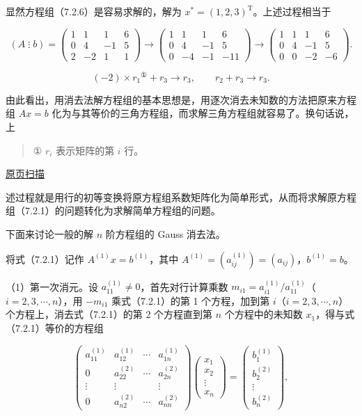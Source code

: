 \documentclass[
  10pt,
  fontset=fandol]{ctexart}
\begin{document}
显然方程组（7.2.6）是容易求解的，解为 \(x^*=(1,2,3)^{\mathrm T}\)。上述过程相当于

\[
(A\mathbin{\vdots}b)=
\left(\begin{array}{rrr|r}1&1&1&6\\0&4&-1&5\\2&-2&1&1\end{array}\right)
\longrightarrow
\left(\begin{array}{rrr|r}1&1&1&6\\0&4&-1&5\\0&-4&-1&-11\end{array}\right)
\longrightarrow
\left(\begin{array}{rrr|r}1&1&1&6\\0&4&-1&5\\0&0&-2&-6\end{array}\right).
\]

\[(-2)\times r_1{}^{\text{①}}+r_3\to r_3,\qquad r_2+r_3\to r_3.\]

由此看出，用消去法解方程组的基本思想是，用逐次消去未知数的方法把原来方程组 \(Ax=b\) 化为与其等价的三角方程组，而求解三角方程组就容易了。换句话说，上

\begin{quote}
① \(r_i\) 表示矩阵的第 \(i\) 行。
\end{quote}

\href{../../source-images/pdf-179.jpeg}{原页扫描}

述过程就是用行的初等变换将原方程组系数矩阵化为简单形式，从而将求解原方程组（7.2.1）的问题转化为求解简单方程组的问题。

下面来讨论一般的解 \(n\) 阶方程组的 Gauss 消去法。

将式（7.2.1）记作 \(A^{(1)}x=b^{(1)}\)，其中 \(A^{(1)}=(a_{ij}^{(1)})=(a_{ij})\)，\(b^{(1)}=b\)。

（1）第一次消元。设 \(a_{11}^{(1)}\ne0\)，首先对行计算乘数 \(m_{i1}=a_{i1}^{(1)}/a_{11}^{(1)}\)（\(i=2,3,\cdots,n\)），用 \(-m_{i1}\) 乘式（7.2.1）的第 1 个方程，加到第 \(i\)（\(i=2,3,\cdots,n\)）个方程上，消去式（7.2.1）的第 2 个方程直到第 \(n\) 个方程中的未知数 \(x_1\)，得与式（7.2.1）等价的方程组

\[
\begin{pmatrix}
a_{11}^{(1)}&a_{12}^{(1)}&\cdots&a_{1n}^{(1)}\\
0&a_{22}^{(2)}&\cdots&a_{2n}^{(2)}\\
\vdots&\vdots&&\vdots\\
0&a_{n2}^{(2)}&\cdots&a_{nn}^{(2)}
\end{pmatrix}
\begin{pmatrix}x_1\\x_2\\\vdots\\x_n\end{pmatrix}
=\begin{pmatrix}b_1^{(1)}\\b_2^{(2)}\\\vdots\\b_n^{(2)}\end{pmatrix},
\tag{7.2.7}
\]
\end{document}
